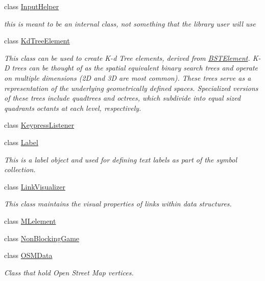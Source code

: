 \begin{DoxyCompactItemize}
class \mbox{\hyperlink{classbridges_1_1_input_helper}{Input\+Helper}}
\begin{DoxyCompactList}\small\item\em this is meant to be an internal class, not something that the library user will use \end{DoxyCompactList}\item 
class \mbox{\hyperlink{classbridges_1_1_kd_tree_element}{Kd\+Tree\+Element}}
\begin{DoxyCompactList}\small\item\em This class can be used to create K-\/d Tree elements, derived from \mbox{\hyperlink{classbridges_1_1_b_s_t_element}{B\+S\+T\+Element}}. K-\/D trees can be thought of as the spatial equivalent binary search trees and operate on multiple dimensions (2D and 3D are most common). These trees serve as a representation of the underlying geometrically defined spaces. Specialized versions of these trees include quadtrees and octrees, which subdivide into equal sized quadrants octants at each level, respectively. \end{DoxyCompactList}\item 
class \mbox{\hyperlink{classbridges_1_1_keypress_listener}{Keypress\+Listener}}
\item 
class \mbox{\hyperlink{classbridges_1_1_label}{Label}}
\begin{DoxyCompactList}\small\item\em This is a label object and used for defining text labels as part of the symbol collection. \end{DoxyCompactList}\item 
class \mbox{\hyperlink{classbridges_1_1_link_visualizer}{Link\+Visualizer}}
\begin{DoxyCompactList}\small\item\em This class maintains the visual properties of links within data structures. \end{DoxyCompactList}\item 
class \mbox{\hyperlink{classbridges_1_1_m_lelement}{M\+Lelement}}
\item 
class \mbox{\hyperlink{classbridges_1_1_non_blocking_game}{Non\+Blocking\+Game}}
\item 
class \mbox{\hyperlink{classbridges_1_1_o_s_m_data}{O\+S\+M\+Data}}
\begin{DoxyCompactList}\small\item\em Class that hold Open Street Map vertices. \end{DoxyCompactList}\item 

\end{DoxyCompactItemize}
